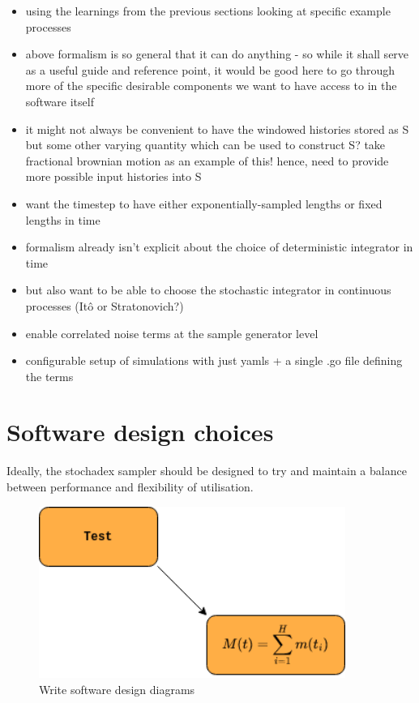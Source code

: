 \documentclass{book}
\begin{document}
\begin{itemize}
\item{using the learnings from the previous sections looking at specific example processes}
\item{above formalism is so general that it can do anything - so while it shall serve as a useful guide and reference point, it would be good here to go through more of the specific desirable components we want to have access to in the software itself}
\item{it might not always be convenient to have the windowed histories stored as S but some other varying quantity which can be used to construct S? take fractional brownian motion as an example of this! hence, need to provide more possible input histories into S}
\item{want the timestep to have either exponentially-sampled lengths or fixed lengths in time}
\item{formalism already isn't explicit about the choice of deterministic integrator in time}
\item{but also want to be able to choose the stochastic integrator in continuous processes (Itô or Stratonovich?)}
\item{enable correlated noise terms at the sample generator level}
\item{configurable setup of simulations with just yamls + a single .go file defining the terms}
\end{itemize}

\section{\sffamily Software design choices}

Ideally, the stochadex sampler should be designed to try and maintain a balance between performance and flexibility of utilisation.

\begin{figure}[h]
\includegraphics[width=10cm]{images/test.drawio.png}
\caption{Write software design diagrams}
\label{fig:design}
\end{figure}
\end{document}
